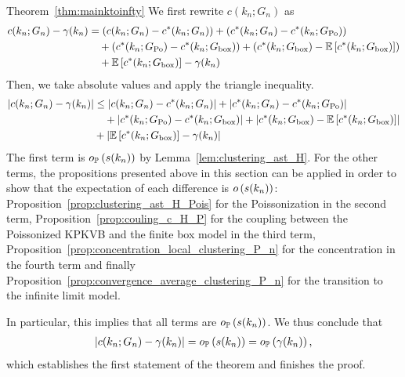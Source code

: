 \begin{proofof}{Theorem~\ref{thm:mainktoinfty}}
We first rewrite $c(k_n; G_n)$ as
\begin{align*}
    c(k_n;G_n)-\gamma(k_n) &= \left(c(k_n;G_n)-c^\ast(k_n;G_n)\right)
    	+ \left(c^\ast(k_n;G_n)-c^\ast(k_n; G_{{\mathrm{Po}}})\right)\\
    &\hspace{10pt}+ \left(c^\ast(k_n; G_{{\mathrm{Po}}})-c^\ast(k_n; G_{\mathrm{box}})\right)
    	+ \left(c^\ast(k_n; G_{\mathrm{box}})-\mathbb{E}\left[c^\ast(k_n; G_{\mathrm{box}})\right]\right)\\
    &\hspace{10pt}+ \mathbb{E}\left[c^\ast(k_n; G_{\mathrm{box}})\right]-\gamma(k_n)
\end{align*}
Then, we take absolute values and apply the triangle inequality. 
\begin{align*}
    \left|c(k_n;G_n)-\gamma(k_n)\right|
    &\le \left|c(k_n;G_n)-c^\ast(k_n;G_n)\right|
    	+\left|c^\ast(k_n;G_n)-c^\ast(k_n; G_{{\mathrm{Po}}})\right|\\
    &\hspace{10pt}+ \left|c^\ast(k_n; G_{{\mathrm{Po}}})-c^\ast(k_n; G_{\mathrm{box}})\right|
    	+ \left|c^\ast(k_n; G_{\mathrm{box}})-\mathbb{E}\left[c^\ast(k_n; G_{\mathrm{box}})\right]\right|\\
    &+ \left|\mathbb{E}\left[c^\ast(k_n; G_{\mathrm{box}})\right]-\gamma(k_n)\right|
\end{align*}
The first term is $o_{\mathbb{P}} \left(s(k_n)\right)$ by Lemma~\ref{lem:clustering_ast_H}. For the other terms, the propositions presented above in this section can be applied in order to show that the expectation of each difference is $o\left(s(k_n)\right)$: Proposition~\ref{prop:clustering_ast_H_Pois} for the Poissonization in the second term, Proposition~\ref{prop:couling_c_H_P} for the coupling between the Poissonized KPKVB and the finite box model in the third term, Proposition~\ref{prop:concentration_local_clustering_P_n} for the concentration in the fourth term and finally Proposition~\ref{prop:convergence_average_clustering_P_n} for the transition to the infinite limit model. 

In particular, this implies that all terms are $o_{\mathbb{P}} \left(s(k_n)\right)$. We thus conclude that
\begin{align*}
    \left|c(k_n;G_n)-\gamma(k_n)\right| = o_{\mathbb{P}} \left(s(k_n)\right) = o_{\mathbb{P}} \left(\gamma(k_n)\right),
\end{align*}
which establishes the first statement of the theorem and finishes the proof.  
\end{proofof}

